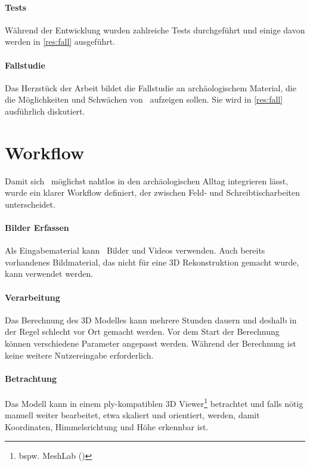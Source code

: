 		\paragraph{Tests}
		Während der Entwicklung wurden zahlreiche Tests durchgeführt und einige davon werden in \autoref{res:fall} ausgeführt.
		
		\paragraph{Fallstudie}
		Das Herzstück der Arbeit bildet die Fallstudie an archäologischem Material, die die Möglichkeiten und Schwächen von \dronarch\ aufzeigen sollen. Sie wird in \autoref{res:fall} ausführlich diskutiert.
		
	\section{Workflow}
		Damit sich \dronarch\ möglichst nahtlos in den archäologischen Alltag integrieren lässt, wurde ein klarer Workflow definiert, der zwischen Feld- und Schreibtischarbeiten unterscheidet.
		
		\paragraph{Bilder Erfassen}
			Als Eingabematerial kann \dronarch\ Bilder und Videos verwenden.
			Auch bereits vorhandenes Bildmaterial, das nicht für eine 3D Rekonstruktion gemacht wurde, kann verwendet werden. %
		
		\paragraph{Verarbeitung}
			Das Berechnung des 3D Modelles kann mehrere Stunden dauern und deshalb in der Regel schlecht vor Ort gemacht werden. Vor dem Start der Berechnung können verschiedene Parameter angepasst werden. %
			Während der Berechnung ist keine weitere Nutzereingabe erforderlich.
		
		\paragraph{Betrachtung}
			Das Modell kann in einem ply-kompatiblen 3D Viewer\footnote{bspw. MeshLab (\cite{meshlab:home})} betrachtet und falls nötig manuell weiter bearbeitet, etwa skaliert und orientiert, werden, damit Koordinaten, Himmelsrichtung und Höhe erkennbar ist.

